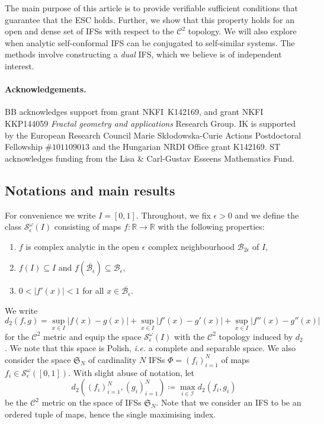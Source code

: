 \documentclass[11pt,]{article}
\theoremstyle{definition}
\theoremstyle{remark}
\newcommand{\0}{\mathbf{0}}
\newcommand{\ie}{{\it i.e.}\/ }
\numberwithin{equation}{section}
\begin{document}
The main purpose of this article is to provide verifiable sufficient conditions that guarantee that the
ESC holds. Further, we show that this property holds for an open and dense set of IFSs with respect to the
$\mathcal{C}^2$ topology. We will also explore when analytic self-conformal IFS can be conjugated to
self-similar systems.
The methods involve constructing a \emph{dual} IFS, which we believe is of independent interest. 

\paragraph{Acknowledgements.} BB acknowledges support from grant NKFI~K142169, and grant NKFI
KKP144059 \textit{Fractal geometry and applications} Research Group. IK is supported by the European
Research Council Marie Sk\l odowska-Curie Actions Postdoctoral Fellowship $\#101109013$ and the
Hungarian NRDI Office grant K142169. ST acknowledges funding from the Lisa \& Carl-Gustav
Esseens Mathematics Fund.

\subsection{Notations and main results}
For convenience we write $I=[0,1]$.
Throughout, we fix $\epsilon>0$ and  we define the class $\mathcal{S}^\omega_\epsilon(I)$
consisting of maps $f:\mathbb{R}\to\mathbb{R}$ with the following properties:
\begin{enumerate}[label=(\Alph*)]
  \item\label{it:a} $f$ is complex analytic in the open $\epsilon$ complex neighbourhood
    $\mathcal{B}_{2\epsilon}$ of  $I$,
  \item\label{it:b} $f(I) \subseteq I$ and $f(\overline{\mathcal{B}_{\epsilon}}) \subseteq
    \mathcal{B}_{\epsilon}$,
  \item\label{it:c} $0<|f'(x)|<1$ for all $x\in\overline{\mathcal{B}_{\epsilon}}$.
\end{enumerate}
We write
\[
  d_2(f,g) = \sup_{x\in I} |f(x)-g(x)|+\sup_{x\in I} |f'(x)-g'(x)| +\sup_{x\in I} |f''(x)-g''(x)|
\]
for the $\mathcal{C}^2$ metric and equip the space $\mathcal{S}^\omega_\epsilon(I)$ with the
$\mathcal{C}^2$ topology induced by $d_2$. We note that this space is Polish, \ie a complete
and separable space.
We also consider the space $\mathfrak{S}_N$ of cardinality $N$ IFSs $\Phi=(f_i)_{i=1}^N$ of maps $f_i\in
\mathcal{S}^\omega_\epsilon([0,1])$. With slight abuse of notation, let
$$
d_2((f_i)_{i=1}^N,(g_i)_{i=1}^N)\coloneqq\max_{i\in\mathcal{I}}d_2(f_i,g_i)
$$
be the $\mathcal{C}^2$ metric on the space of IFSs $\mathfrak{S}_N$. Note that we consider an IFS to
be an ordered tuple of maps, hence the single maximising index.
\end{document}
